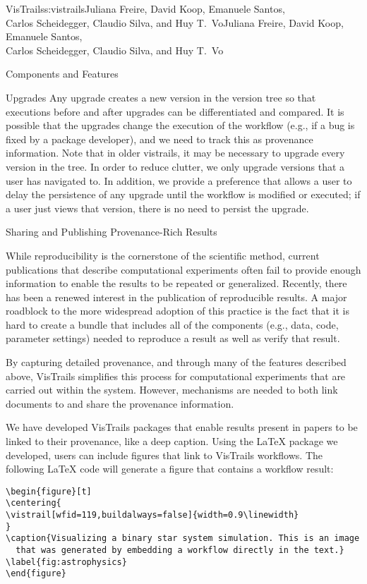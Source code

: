 \begin{aosachaptertoc}{VisTrails}{s:vistrails}{Juliana Freire, David Koop, Emanuele Santos, \\ Carlos Scheidegger, Claudio Silva, and Huy T.\ Vo}{Juliana Freire, David Koop, Emanuele Santos, \\ \hspace*{0.9cm} Carlos Scheidegger, Claudio Silva, and Huy T.\ Vo}
\begin{aosasect1}{Components and Features}
\begin{aosasect2}{Upgrades}
Any upgrade creates a new version in the version tree so that
executions before and after upgrades can be differentiated and
compared.  It is possible that the upgrades change the execution of
the workflow (e.g., if a bug is fixed by a package developer), and we
need to track this as provenance information.  Note that in older
vistrails, it may be necessary to upgrade every version in the tree.
In order to reduce clutter, we only upgrade versions that a user has
navigated to.  In addition, we provide a preference that allows a user
to delay the persistence of any upgrade until the workflow is modified
or executed; if a user just views that version, there is no need to
persist the upgrade.

\end{aosasect2}

\begin{aosasect2}{Sharing and Publishing Provenance-Rich Results}
\label{sec.vistrails.publish}

While reproducibility is the cornerstone of the scientific method,
current publications that describe computational experiments 
often fail to provide enough information to enable the results
to be repeated or generalized. Recently, there has been a renewed
interest in the publication of reproducible results. A major roadblock
to the more widespread adoption of this practice is the fact that it
is hard to create a bundle that includes all of the components (e.g.,
data, code, parameter settings) needed to reproduce a result as well
as verify that result.

By capturing detailed provenance, and through many of the features
described above, VisTrails simplifies this process for computational
experiments that are carried out within the system. However,
mechanisms are needed to both link documents to and share the
provenance information.

We have developed VisTrails packages that enable results present in
papers to be linked to their provenance, like a deep caption. Using
the LaTeX package we developed, users can include figures that link to
VisTrails workflows.  The following LaTeX code will generate a figure
that contains a workflow result:

\begin{verbatim}
\begin{figure}[t]
\centering{
\vistrail[wfid=119,buildalways=false]{width=0.9\linewidth}
}
\caption{Visualizing a binary star system simulation. This is an image
  that was generated by embedding a workflow directly in the text.}
\label{fig:astrophysics}
\end{figure}
\end{verbatim}


\end{aosasect2}
\end{aosasect1}
\end{aosachaptertoc}
